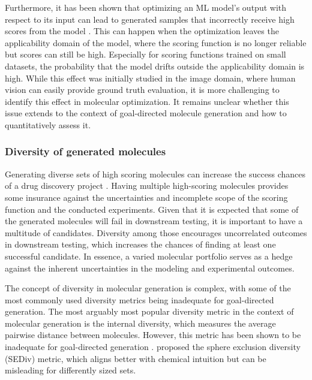 Furthermore, it has been shown that optimizing an ML model's output with respect to its input can
lead to generated samples that incorrectly receive high scores from the model
\citep{szegedyIntriguingPropertiesNeural2014,goodfellowExplainingHarnessingAdversarial2015}.
This can happen when the optimization leaves the applicability domain of the model, where
the scoring function is no longer reliable but scores can still be high. Especially for scoring
functions trained on small datasets, the probability that the model drifts outside the applicability
domain is high. While this effect was initially studied in the image domain, where human vision can easily provide
ground truth evaluation, it is more challenging to identify this effect in molecular optimization.
It remains unclear whether this issue extends to the context of goal-directed molecule generation
and how to quantitatively assess it.

\subsubsection{Diversity of generated molecules}
Generating diverse sets of high scoring molecules can increase the success chances of a drug
discovery project
\citep{martinDiverseViewpointsComputational2001,gorseDiversityMedicinalChemistry2006}. Having
multiple high-scoring molecules provides some insurance against the uncertainties and incomplete
scope of the scoring function and the conducted experiments. Given that it is expected that some of
the generated molecules will fail in downstream testing, it is important to have a multitude of
candidates. Diversity among those encourages uncorrelated outcomes in downstream testing, which
increases the chances of finding at least one successful candidate. In essence, a varied molecular
portfolio serves as a hedge against the inherent uncertainties in the modeling and experimental
outcomes.

The concept of diversity in molecular generation is complex, with some of the most commonly used
diversity metrics being inadequate for goal-directed generation. The most arguably most popular
diversity metric in the context of molecular generation is the internal diversity, which measures the
average pairwise distance between molecules. However, this metric has been shown to be inadequate for
goal-directed generation \citep{waldmanNovelAlgorithmsOptimization2000,xieMARSMarkovMolecular2021,thomasComparisonStructureLigandbased2021}.
\citet{thomasComparisonStructureLigandbased2021} proposed the sphere exclusion diversity (SEDiv)
metric, which aligns better with chemical intuition but can be misleading for differently sized
sets.

